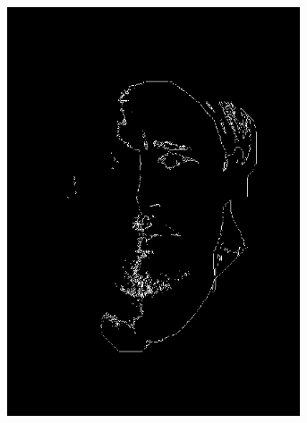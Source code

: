 \begin{figure}[H]
\begin{subfigure}{.16\textwidth}
  \includegraphics[width=0.95\textwidth]{img/fd3/grayFaceNormalFilteredFaceMask.png}
  \caption{}
\end{subfigure}%
\begin{subfigure}{.16\textwidth}
  \centering

\end{subfigure}
\end{figure}

